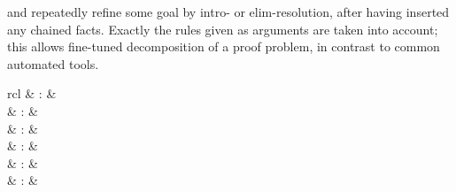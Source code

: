 \begin{isabellebody}
\begin{isamarkuptext}
\begin{description}
  \item \hyperlink{method.intro}{\mbox{}} and \hyperlink{method.elim}{\mbox{}} repeatedly refine some goal
  by intro- or elim-resolution, after having inserted any chained
  facts.  Exactly the rules given as arguments are taken into account;
  this allows fine-tuned decomposition of a proof problem, in contrast
  to common automated tools.

  \end{description}%
\end{isamarkuptext}%
\isamarkuptrue%
%
\isamarkuptrue%
%
\begin{isamarkuptext}%
\begin{matharray}{rcl}
    \hypertarget{method.blast}{\hyperlink{method.blast}{\mbox{}}} & : &  \\
    \hypertarget{method.fast}{\hyperlink{method.fast}{\mbox{}}} & : &  \\
    \hypertarget{method.slow}{\hyperlink{method.slow}{\mbox{}}} & : &  \\
    \hypertarget{method.best}{\hyperlink{method.best}{\mbox{}}} & : &  \\
    \hypertarget{method.safe}{\hyperlink{method.safe}{\mbox{}}} & : &  \\
    \hypertarget{method.clarify}{\hyperlink{method.clarify}{\mbox{}}} & : &  \\
  \end{matharray}


\end{isamarkuptext}
\end{isabellebody}
